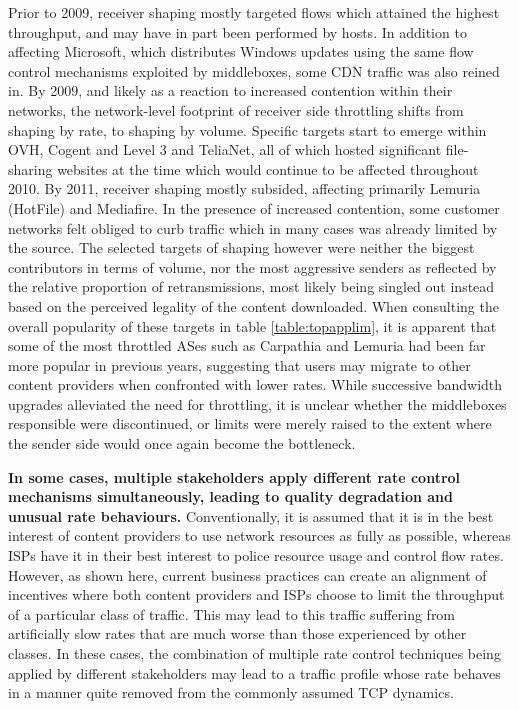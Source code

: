 Prior to 2009, receiver shaping mostly targeted flows which attained the highest throughput, and may have in part been performed by hosts. 
In addition to affecting Microsoft, which distributes Windows updates using the same flow control mechanisms exploited by middleboxes, some CDN traffic was also reined in.
By 2009, and likely as a reaction to increased contention within their networks, the network-level footprint of receiver side throttling shifts from shaping by rate, to shaping by volume.
Specific targets start to emerge within OVH, Cogent and Level 3 and TeliaNet, all of which hosted significant file-sharing websites at the time which would continue to be affected throughout 2010.
By 2011, receiver shaping mostly subsided, affecting primarily Lemuria (HotFile) and Mediafire.
In the presence of increased contention, some customer networks felt obliged to curb traffic which in many cases was already limited by the source.
The selected targets of shaping however were neither the biggest contributors in terms of volume, nor the most aggressive senders as reflected by the relative proportion of retransmissions, most likely being singled out instead based on the perceived legality of the content downloaded.
When consulting the overall popularity of these targets in table \ref{table:topapplim}, it is apparent that some of the most throttled ASes such as Carpathia and Lemuria had been far more popular in previous years, suggesting that users may migrate to other content providers when confronted with lower rates.
While successive bandwidth upgrades alleviated the need for throttling, it is unclear whether the middleboxes responsible were discontinued, or limits were merely raised to the extent where the sender side would once again become the bottleneck.

\textbf{In some cases, multiple stakeholders apply different rate control mechanisms simultaneously, leading to quality degradation and unusual rate behaviours.}
Conventionally, it is assumed that it is in the best interest of content providers to use network resources as fully as possible, whereas ISPs have it in their best interest to police resource usage and control flow rates. 
However, as shown here, current business practices can create an alignment of incentives where both content providers and ISPs choose to limit the throughput of a particular class of traffic. 
This may lead to this traffic suffering from artificially slow rates that are much worse than those experienced by other classes. 
In these cases, the combination of multiple rate control techniques being applied by different stakeholders may lead to a traffic profile whose rate behaves in a manner quite removed from the commonly assumed TCP dynamics.

